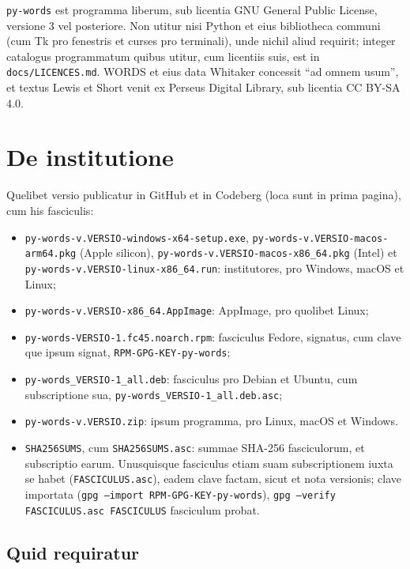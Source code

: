 \documentclass[12pt,
              article,
              oneside
              ]{memoir}
\begin{document}
%
\texttt{py-words} est programma liberum, sub licentia GNU General Public
License, versione 3 vel posteriore. Non utitur nisi Python et eius
bibliotheca communi (cum Tk pro fenestris et curses pro terminali), unde
nichil aliud requirit; integer catalogus programmatum quibus utitur, cum
licentiis suis, est in \texttt{docs/LICENCES.md}. WORDS et eius data
Whitaker concessit \enquote{ad omnem usum}, et textus Lewis et Short venit
ex Perseus Digital Library, sub licentia CC BY-SA 4.0.

\section{De institutione}
\label{sec:install}

Quelibet versio publicatur in GitHub et in Codeberg (loca sunt in prima
pagina), cum his fasciculis:

%
\begin{itemize}
\item \texttt{py-words-v.VERSIO-windows-x64-setup.exe},
  \texttt{py-words-v.VERSIO-macos-arm64.pkg} (Apple silicon),
  \texttt{py-words-v.VERSIO-macos-x86\_64.pkg} (Intel) et
  \texttt{py-words-v.VERSIO-linux-x86\_64.run}: institutores, pro
  Windows, macOS et Linux;
\item \texttt{py-words-v.VERSIO-x86\_64.AppImage}: AppImage, pro
  quolibet Linux;
\item \texttt{py-words-VERSIO-1.fc45.noarch.rpm}: fasciculus Fedore,
  signatus, cum clave que ipsum signat, \texttt{RPM-GPG-KEY-py-words};
\item \texttt{py-words\_VERSIO-1\_all.deb}: fasciculus pro Debian et
  Ubuntu, cum subscriptione sua, \texttt{py-words\_VERSIO-1\_all.deb.asc};
\item \texttt{py-words-v.VERSIO.zip}: ipsum programma, pro Linux, macOS
  et Windows.
\item \texttt{SHA256SUMS}, cum \texttt{SHA256SUMS.asc}: summae SHA-256
  fasciculorum, et subscriptio earum. Unusquisque fasciculus etiam suam
  subscriptionem iuxta se habet (\texttt{FASCICULUS.asc}), eadem clave
  factam, sicut et nota versionis; clave importata (\texttt{gpg --import
  RPM-GPG-KEY-py-words}), \texttt{gpg --verify FASCICULUS.asc FASCICULUS}
  fasciculum probat.
\end{itemize}

\subsection{Quid requiratur}
\end{document}
